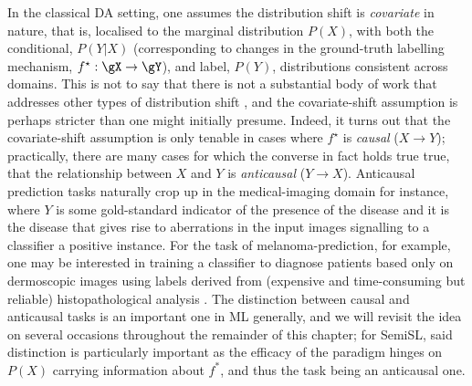 %
In the classical DA setting, one assumes the distribution shift is \emph{covariate}
\cite{david2010impossibility} in nature, that is, localised to the marginal distribution \(P(X)\),
with both the conditional, \(P(Y|X)\) (corresponding to changes in the ground-truth labelling
mechanism, \( f^\star: \gX \to \gY \)), and label, \(P(Y)\), distributions consistent across
domains.
%
This is not to say that there is not a substantial body of work that addresses other types of
distribution shift \citep{zhao2019learning}, and the covariate-shift assumption is perhaps stricter
than one might initially presume.
%
Indeed, it turns out that the covariate-shift assumption is only tenable in cases where \(f^\star\)
is \emph{causal} (\(X \to Y\)); practically, there are many cases for which the converse in fact
holds true true, that the relationship between \(X\) and \(Y\) is \emph{anticausal} (\(Y \to X\)).
%
Anticausal prediction tasks naturally crop up in the medical-imaging domain for instance, where
\(Y\) is some gold-standard indicator of the presence of the disease and it is the disease that
gives rise to aberrations in the input images signalling to a classifier a positive instance. 
%
For the task of melanoma-prediction, for example, one may be interested in training a classifier to
diagnose patients based only on dermoscopic images using labels derived from (expensive and
time-consuming but reliable) histopathological analysis \citep{castro2020causality}.
%
The distinction between causal and anticausal tasks is an important one in ML generally, and we
will revisit the idea on several occasions throughout the remainder of this chapter; for SemiSL,
said distinction is particularly important as the efficacy of the paradigm hinges on \( P(X) \)
carrying information about \(f^\ast\), and thus the task being an anticausal one.
%
%
